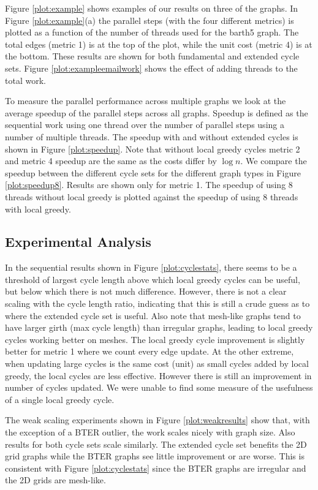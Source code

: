 \documentclass{sig-alternate}
\begin{document}
Figure \ref{plot:example} shows
examples of our results on three of the graphs.
In Figure \ref{plot:example}(a)
the parallel steps
(with the four different metrics) is plotted as a
function of the number of threads
used for the barth5 graph. The total edges (metric 1) is at the
top of the plot, while the unit cost (metric 4) is at the bottom.
These results are shown for both fundamental and extended cycle sets.
Figure \ref{plot:exampleemailwork}
shows the effect of adding threads to the total work.

To measure the parallel performance across multiple graphs
we look at the average speedup of
the parallel steps across all graphs.
Speedup is defined as the sequential work using one thread over the
number of parallel steps using a number of multiple threads.
The speedup with and without extended cycles is shown in
Figure \ref{plot:speedup}. Note that without local greedy cycles
metric 2 and metric 4
speedup are the same as the costs differ by $\log{n}$.
We compare the speedup between the different cycle sets
for the different graph types in Figure \ref{plot:speedup8}.
Results are shown only for metric 1.
The speedup of using 8 threads without local greedy is plotted
against the speedup of using 8 threads with local greedy.

\subsection{Experimental Analysis}
In the sequential results shown in Figure \ref{plot:cyclestats},
there seems to be a threshold of largest cycle length above
which local greedy cycles can be useful,
but below which there is not much difference.
However, there is not a clear scaling with the cycle length ratio,
indicating that this is still a crude guess as to where
the extended cycle set is useful.
Also note that mesh-like graphs
tend to have larger girth (max cycle length) than
irregular graphs, leading to local greedy cycles working better on meshes.
The local greedy cycle improvement is slightly better for metric 1
where we count every edge update.
At the other extreme, when updating large cycles is the same cost (unit)
as small cycles added by local greedy, the local cycles are less effective.
However there is still an improvement in number of cycles updated.
We were unable to find some measure of
the usefulness of a single local greedy cycle.

The weak scaling experiments shown in Figure \ref{plot:weakresults}
show that, with the exception of a BTER outlier, the work scales nicely
with graph size. Also results for both cycle sets scale similarly.
The extended cycle set benefits the 2D grid graphs while
the BTER graphs see little improvement or are worse.
This is consistent with Figure \ref{plot:cyclestats} since the BTER
graphs are irregular and the 2D grids are mesh-like.
\end{document}
